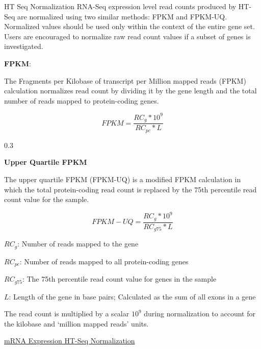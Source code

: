 \documentclass[
]{book}
\begin{document}
\begin{Definition}{HT Seq Normalization}{}
RNA-Seq expression level read counts produced by HT-Seq are normalized using two similar methods: FPKM and FPKM-UQ. Normalized values should be used only within the context of the entire gene set. Users are encouraged to normalize raw read count values if a subset of genes is investigated.

\textbf{FPKM}:

The Fragments per Kilobase of transcript per Million mapped reads (FPKM) calculation normalizes read count by dividing it by the gene length and the total number of reads mapped to protein-coding genes.

\[FPKM = \dfrac{RC_g*10^9}{RC_{pc}*L}\]

\hfill{0.3}

\textbf{Upper Quartile FPKM}

The upper quartile FPKM (FPKM-UQ) is a modified FPKM calculation in which the total protein-coding read count is replaced by the 75th percentile read count value for the sample.

\[FPKM-UQ = \dfrac{RC_g*10^9}{RC_{g75}*L}\]

\(RC_g\): Number of reads mapped to the gene

\(RC_{pc}\): Number of reads mapped to all protein-coding genes

\(RC_{g75}\): The 75th percentile read count value for genes in the sample

\(L\): Length of the gene in base pairs; Calculated as the sum of all exons in a gene

The read count is multiplied by a scalar \(10^9\) during normalization to account for the kilobase and `million mapped reads' units.

\href{https://docs.gdc.cancer.gov/Data/Bioinformatics_Pipelines/Expression_mRNA_Pipeline/#mrna-expression-ht-seq-normalization}{mRNA Expression HT-Seq Normalization}

\end{Definition}
\end{document}
